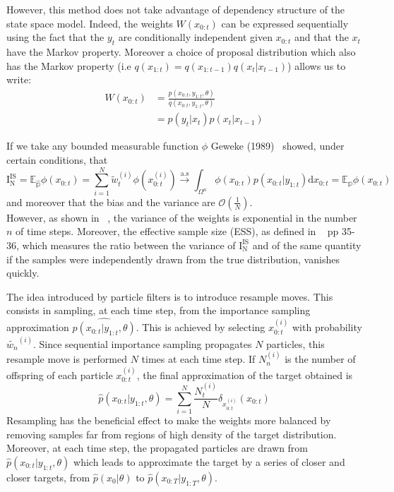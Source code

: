 \documentclass{article}
\begin{document}
	However, this method does not take advantage of dependency structure of the state space model. Indeed, the weights $W(x_{0:t})$ can be expressed sequentially using the fact that the $y_t$ are conditionally independent given $x_{0:t}$ and that the $x_t$ have the Markov property. Moreover a choice of proposal distribution which also has the Markov property (i.e $q(x_{1:t})=q(x_{1:t-1})q(x_t| x_{t-1})$) allows us to write:
	\begin{align}
		W(x_{0:t}) & = \frac{p(x_{0:t},y_{1:t}, \theta)}{q(x_{0:t},y_{1:t}, \theta)} \\
		& = p(y_t|x_t)p(x_t|x_{t-1})
	\end{align}
	
	If we take any bounded measurable function $\phi$ Geweke (1989)~\cite{Geweke1989} showed, under certain conditions, that \begin{equation*}
		 \mathrm{I_N^{IS}}=\mathbb{E_{\hat{p}}}\phi(x_{0:t}) = \sum_{i=1}^{N} \tilde{w}_t^{(i)} \phi(x_{0:t}^{(i)}) \xrightarrow{\mathrm{a.s}} \int_{\Omega^n} \phi({x_{0:t}})p(x_{0:t}|y_{1:t})\mathrm{d}x_{0:t}=\mathbb{E_{{p}}}\phi(x_{0:t})
	\end{equation*}
	and moreover that the bias and the variance are $\mathcal{O}(\frac{1}{N})$.\\
	
	However, as shown in ~\cite{kong1994sequential}, the variance of the weights is exponential in the number $n$ of time steps. Moreover, the effective sample size (ESS), as defined in ~\cite{liu2008monte} pp 35-36, which measures the ratio between the variance of $\mathrm{I_N^{IS}}$ and of the same quantity if the samples were independently drawn from the true distribution, vanishes quickly.  
	
	The idea introduced by particle filters is to introduce resample moves. This consists in sampling, at each time step, from the importance sampling approximation $\hat{p(x_{0:t}|y_{1:t}, \theta)}$. This is achieved by selecting $x_{0:t}^{(i)}$ with probability $\tilde{w_n}^{(i)}$. Since sequential importance sampling propagates $N$ particles, this resample move is performed $N$ times at each time step. If $N_n^{(i)}$ is the number of offspring of each particle $x_{0:t}^{(i)}$, the final approximation of the target obtained is 
	\begin{equation*}
	 	\hat{p}(x_{0:t}|y_{1:t}, \theta) = \sum_{i=1}^{N}\frac{N_t^{(i)}}{N} \delta_{x_{0:t}^{(i)}}(x_{0:t})
	\end{equation*}
	Resampling has the beneficial effect to make the weights more balanced by removing samples far from regions of high density of the target distribution. Moreover, at each time step, the propagated particles are drawn from $\hat{p}(x_{0:t}|y_{1:t}, \theta)$ which leads to approximate the target by a series of closer and closer targets, from $\hat{p}(x_0|\theta)$ to $\hat{p}(x_{0:T}|y_{1:T}, \theta)$.
	 
\end{document}
